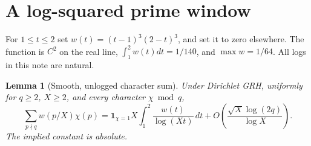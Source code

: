 \documentclass[11pt]{article}
\newtheorem{lemma}[theorem]{Lemma}
\theoremstyle{remark}\newtheorem{remark}[theorem]{Remark}
\begin{document}
\section{A log-squared prime window}\label{sec:window}
For $1\le t\le2$ set $w(t)=(t-1)^3(2-t)^3$, and set it to zero elsewhere. The function is $C^2$ on the real line, $\int_1^2w(t)dt=1/140$, and $\max w=1/64$. All logs in this note are natural.
\begin{lemma}[Smooth, unlogged character sum]\label{lem:prime}
Under Dirichlet GRH, uniformly for $q\ge2$, $X\ge2$, and every character $\chi\bmod q$,
\begin{equation}\label{eq:prime}
 \sum_{p\nmid q} w(p/X)\chi(p)
 =\mathbf1_{\chi=1}X\int_1^2\frac{w(t)}{\log(Xt)}\,dt
 +O\left(\frac{\sqrt X\log(2q)}{\log X}\right).
\end{equation}
The implied constant is absolute.
\end{lemma}
\end{document}
